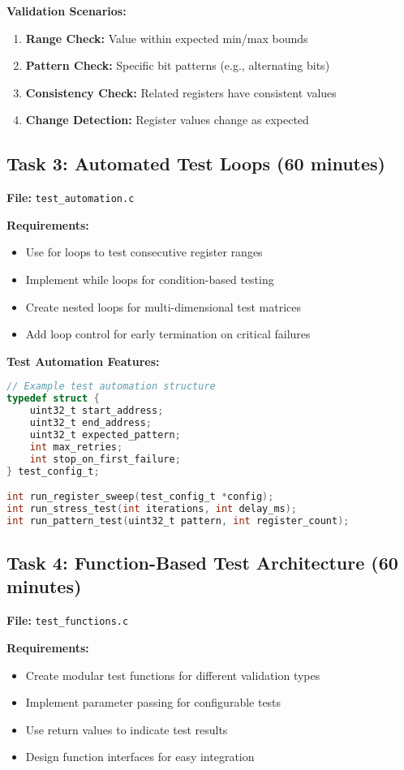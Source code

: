 \documentclass[11pt,a4paper]{article}
\begin{document}
\textbf{Validation Scenarios:}
\begin{enumerate}
    \item \textbf{Range Check:} Value within expected min/max bounds
    \item \textbf{Pattern Check:} Specific bit patterns (e.g., alternating bits)
    \item \textbf{Consistency Check:} Related registers have consistent values
    \item \textbf{Change Detection:} Register values change as expected
\end{enumerate}

\subsection{Task 3: Automated Test Loops (60 minutes)}

\textbf{File:} \texttt{test\_automation.c}

\textbf{Requirements:}
\begin{itemize}
    \item Use for loops to test consecutive register ranges
    \item Implement while loops for condition-based testing
    \item Create nested loops for multi-dimensional test matrices
    \item Add loop control for early termination on critical failures
\end{itemize}

\textbf{Test Automation Features:}
\begin{lstlisting}[language=C]
// Example test automation structure
typedef struct {
    uint32_t start_address;
    uint32_t end_address;
    uint32_t expected_pattern;
    int max_retries;
    int stop_on_first_failure;
} test_config_t;

int run_register_sweep(test_config_t *config);
int run_stress_test(int iterations, int delay_ms);
int run_pattern_test(uint32_t pattern, int register_count);
\end{lstlisting}

\subsection{Task 4: Function-Based Test Architecture (60 minutes)}

\textbf{File:} \texttt{test\_functions.c}

\textbf{Requirements:}
\begin{itemize}
    \item Create modular test functions for different validation types
    \item Implement parameter passing for configurable tests
    \item Use return values to indicate test results
    \item Design function interfaces for easy integration
\end{itemize}
\end{document}
